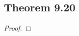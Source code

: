 \documentclass[../../main.tex]{subfiles}
\begin{document}
\subsection{Theorem 9.20}
\begin{wts}

\end{wts}
\begin{proof}

\end{proof}
\end{document}
